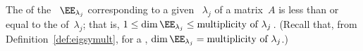 \begin{theorem} \label{thm:dimee} 
The  of the ~\(\EE_{\lambda_j}\) corresponding to a given ~\(\lambda_j\) of a matrix~\(A\) is less than or equal to the  of~\(\lambda_j\);
that is, \(1\leq\dim\EE_{\lambda_j}\leq\text{multiplicity of }\lambda_j\)\,.  
(Recall that, from Definition~\ref{def:eigsymult}, for a , \(\dim\EE_{\lambda_j}=\text{multiplicity of }\lambda_j\).)
\end{theorem}
